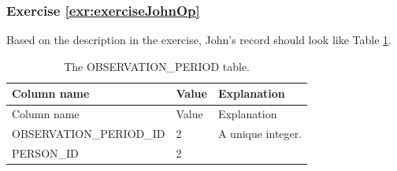 \documentclass[11pt]{book}
\theoremstyle{definition}
\theoremstyle{definition}
\theoremstyle{definition}
\theoremstyle{remark}
\begin{document}
\hypertarget{exercise-refexrexercisejohnop}{%
\subsubsection*{Exercise \ref{exr:exerciseJohnOp}}\label{exercise-refexrexercisejohnop}}

Based on the description in the exercise, John's record should look like Table \ref{tab:johnOp}.

\begin{longtable}[]{@{}lll@{}}
\caption{\label{tab:johnOp} The OBSERVATION\_PERIOD table.}\tabularnewline
\toprule
\begin{minipage}[b]{0.28\columnwidth}\raggedright
Column name\strut
\end{minipage} & \begin{minipage}[b]{0.15\columnwidth}\raggedright
Value\strut
\end{minipage} & \begin{minipage}[b]{0.49\columnwidth}\raggedright
Explanation\strut
\end{minipage}\tabularnewline
\midrule
\endfirsthead
\toprule
\begin{minipage}[b]{0.28\columnwidth}\raggedright
Column name\strut
\end{minipage} & \begin{minipage}[b]{0.15\columnwidth}\raggedright
Value\strut
\end{minipage} & \begin{minipage}[b]{0.49\columnwidth}\raggedright
Explanation\strut
\end{minipage}\tabularnewline
\midrule
\endhead
\begin{minipage}[t]{0.28\columnwidth}\raggedright
OBSERVATION\_PERIOD\_ID\strut
\end{minipage} & \begin{minipage}[t]{0.15\columnwidth}\raggedright
2\strut
\end{minipage} & \begin{minipage}[t]{0.49\columnwidth}\raggedright
A unique integer.\strut
\end{minipage}\tabularnewline
\begin{minipage}[t]{0.28\columnwidth}\raggedright
PERSON\_ID\strut
\end{minipage} & \begin{minipage}[t]{0.15\columnwidth}\raggedright
2\strut
\end{minipage} & \begin{minipage}[t]{0.49\columnwidth}\raggedright

\end{minipage}
\end{longtable}
\end{document}
